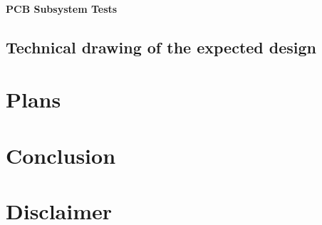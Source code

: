 \documentclass[a4paper,12pt]{article}
\begin{document}
	\paragraph{PCB Subsystem Tests}
	
	
	\subsection{Technical drawing of the expected design}
	

\section{Plans}


\section{Conclusion}



\section{Disclaimer}
\end{document}
